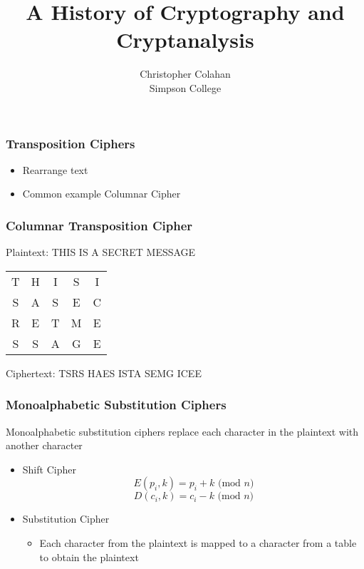 \documentclass[12pt]{beamer}
\title{A History of Cryptography and Cryptanalysis}
\date{}
\author{Christopher Colahan\\ Simpson College}
\begin{document}
\frame{\titlepage}

\begin{frame}
	\frametitle{Transposition Ciphers}
	\begin{itemize}
		\item Rearrange text
		\item Common example Columnar Cipher
	\end{itemize}
	\cite[pg. 12]{appcrypt}
\end{frame}

\begin{frame}
	\frametitle{Columnar Transposition Cipher}
	Plaintext: THIS IS A SECRET MESSAGE
	\begin{center}
		\begin{tabular}{c c c c c}
			T & H & I & S & I \\
			S & A & S & E & C \\
			R & E & T & M & E \\
			S & S & A & G & E
		\end{tabular}
	\end{center}

	Ciphertext: TSRS HAES ISTA SEMG ICEE
\end{frame}

\begin{frame}
	\frametitle{Monoalphabetic Substitution Ciphers}
	Monoalphabetic substitution ciphers replace each character in the plaintext with another character
	\begin{itemize}
		\item Shift Cipher
		$$E(p_i,k)=p_i+k\text{ (mod $n$)}$$
		$$D(c_i,k)=c_i-k\text{ (mod $n$)}$$
		\item Substitution Cipher
		\begin{itemize}
			\item Each character from the plaintext is mapped to a character from a table to obtain the plaintext
		\end{itemize}
	\end{itemize}
\end{frame}
\end{document}
